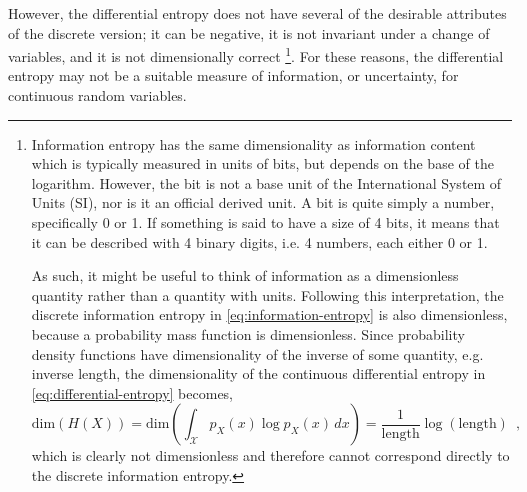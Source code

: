 However, the differential entropy does not have several of the desirable attributes of the discrete version; it can be negative, it is not invariant under a change of variables, and it is not dimensionally correct%
\footnote{\label{fn:dimensional-analysis-of-differential-entropy}
    Information entropy has the same dimensionality as information content which is typically measured in units of bits, but depends on the base of the logarithm. 
    However, the bit is not a base unit of the International System of Units (SI), nor is it an official derived unit.
    A bit is quite simply a number, specifically 0 or 1. If something is said to have a size of 4 bits, it means that it can be described with 4 binary digits, i.e. 4 numbers, each either 0 or 1.

    As such, it might be useful to think of information as a dimensionless quantity rather than a quantity with units.
    Following this interpretation, the discrete information entropy in \cref{eq:information-entropy} is also dimensionless, because a probability mass function is dimensionless. 
    Since probability density functions have dimensionality of the inverse of some quantity, e.g. inverse length, the dimensionality of the continuous differential entropy in \cref{eq:differential-entropy} becomes,
    \begin{equation*}
        \text{dim} \left( H(X) \right) = \text{dim} \left( \int_{\mathcal{X}} p_X(x) \log p_X(x) \, dx \right) = \frac{1}{\text{length}} \log\left(\text{length}\right) \enspace ,
    \end{equation*}
    which is clearly not dimensionless and therefore cannot correspond directly to the discrete information entropy.
}. 
For these reasons, the differential entropy may not be a suitable measure of information, or uncertainty, for continuous random variables. 

